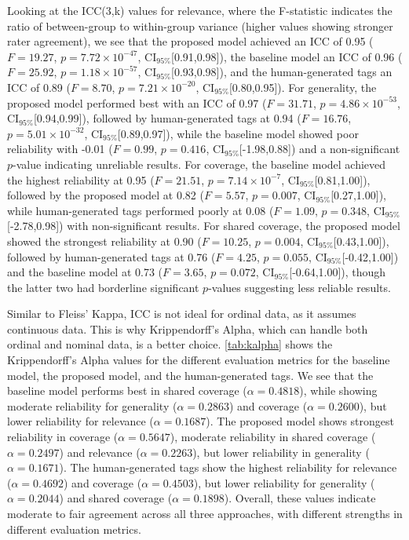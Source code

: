 Looking at the ICC(3,k) values for relevance, where the F-statistic indicates the ratio of between-group to within-group variance (higher values showing stronger rater agreement), we see that the proposed model achieved an ICC of 0.95 ($F=19.27$, $p=7.72\times10^{-47}$, CI$_{95\%}$[0.91,0.98]), the baseline model an ICC of 0.96 ($F=25.92$, $p=1.18\times10^{-57}$, CI$_{95\%}$[0.93,0.98]), and the human-generated tags an ICC of 0.89 ($F=8.70$, $p=7.21\times10^{-20}$, CI$_{95\%}$[0.80,0.95]). For generality, the proposed model performed best with an ICC of 0.97 ($F=31.71$, $p=4.86\times10^{-53}$, CI$_{95\%}$[0.94,0.99]), followed by human-generated tags at 0.94 ($F=16.76$, $p=5.01\times10^{-32}$, CI$_{95\%}$[0.89,0.97]), while the baseline model showed poor reliability with -0.01 ($F=0.99$, $p=0.416$, CI$_{95\%}$[-1.98,0.88]) and a non-significant $p$-value indicating unreliable results. For coverage, the baseline model achieved the highest reliability at 0.95 ($F=21.51$, $p=7.14\times10^{-7}$, CI$_{95\%}$[0.81,1.00]), followed by the proposed model at 0.82 ($F=5.57$, $p=0.007$, CI$_{95\%}$[0.27,1.00]), while human-generated tags performed poorly at 0.08 ($F=1.09$, $p=0.348$, CI$_{95\%}$[-2.78,0.98]) with non-significant results. For shared coverage, the proposed model showed the strongest reliability at 0.90 ($F=10.25$, $p=0.004$, CI$_{95\%}$[0.43,1.00]), followed by human-generated tags at 0.76 ($F=4.25$, $p=0.055$, CI$_{95\%}$[-0.42,1.00]) and the baseline model at 0.73 ($F=3.65$, $p=0.072$, CI$_{95\%}$[-0.64,1.00]), though the latter two had borderline significant $p$-values suggesting less reliable results.

Similar to Fleiss' Kappa, ICC is not ideal for ordinal data, as it assumes continuous data. This is why Krippendorff's Alpha, which can handle both ordinal and nominal data, is a better choice. \cref{tab:kalpha} shows the Krippendorff's Alpha values for the different evaluation metrics for the baseline model, the proposed model, and the human-generated tags. We see that the baseline model performs best in shared coverage ($\alpha=0.4818$), while showing moderate reliability for generality ($\alpha=0.2863$) and coverage ($\alpha=0.2600$), but lower reliability for relevance ($\alpha=0.1687$). The proposed model shows strongest reliability in coverage ($\alpha=0.5647$), moderate reliability in shared coverage ($\alpha=0.2497$) and relevance ($\alpha=0.2263$), but lower reliability in generality ($\alpha=0.1671$). The human-generated tags show the highest reliability for relevance ($\alpha=0.4692$) and coverage ($\alpha=0.4503$), but lower reliability for generality ($\alpha=0.2044$) and shared coverage ($\alpha=0.1898$). Overall, these values indicate moderate to fair agreement across all three approaches, with different strengths in different evaluation metrics.

